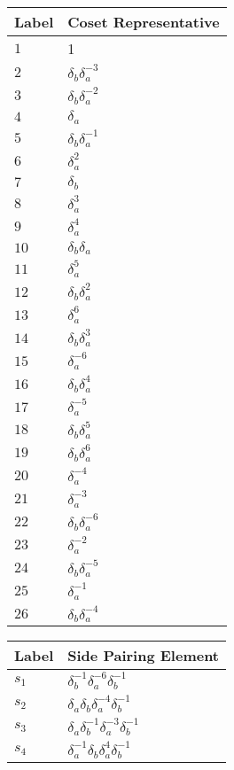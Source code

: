 \documentclass{article}
\begin{document}

\begin{center}
\begin{tabular}{ll}
\toprule
Label & Coset Representative\\
\midrule
$1$ & 1 \\
$2$ & $\delta_b^{}\delta_a^{-3}$ \\
$3$ & $\delta_b^{}\delta_a^{-2}$ \\
$4$ & $\delta_a^{}$ \\
$5$ & $\delta_b^{}\delta_a^{-1}$ \\
$6$ & $\delta_a^{2}$ \\
$7$ & $\delta_b^{}$ \\
$8$ & $\delta_a^{3}$ \\
$9$ & $\delta_a^{4}$ \\
$10$ & $\delta_b^{}\delta_a^{}$ \\
$11$ & $\delta_a^{5}$ \\
$12$ & $\delta_b^{}\delta_a^{2}$ \\
$13$ & $\delta_a^{6}$ \\
$14$ & $\delta_b^{}\delta_a^{3}$ \\
$15$ & $\delta_a^{-6}$ \\
$16$ & $\delta_b^{}\delta_a^{4}$ \\
$17$ & $\delta_a^{-5}$ \\
$18$ & $\delta_b^{}\delta_a^{5}$ \\
$19$ & $\delta_b^{}\delta_a^{6}$ \\
$20$ & $\delta_a^{-4}$ \\
$21$ & $\delta_a^{-3}$ \\
$22$ & $\delta_b^{}\delta_a^{-6}$ \\
$23$ & $\delta_a^{-2}$ \\
$24$ & $\delta_b^{}\delta_a^{-5}$ \\
$25$ & $\delta_a^{-1}$ \\
$26$ & $\delta_b^{}\delta_a^{-4}$ \\
\bottomrule
\end{tabular}
\hfill
\begin{tabular}{ll}
\toprule
Label & Side Pairing Element\\
\midrule
$s_{1}$ & $\delta_b^{-1}\delta_a^{-6}\delta_b^{-1}$ \\
$s_{2}$ & $\delta_a^{}\delta_b^{}\delta_a^{-4}\delta_b^{-1}$ \\
$s_{3}$ & $\delta_a^{}\delta_b^{-1}\delta_a^{-3}\delta_b^{-1}$ \\
$s_{4}$ & $\delta_a^{-1}\delta_b^{}\delta_a^{4}\delta_b^{-1}$ \\

\end{tabular}
\end{center}
\end{document}
